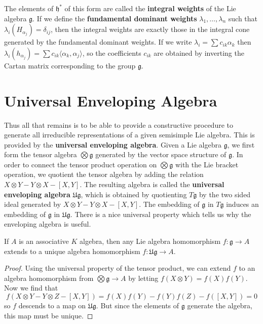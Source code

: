 The elements of $\mathfrak{h}^*$ of this form are called the {\bf integral weights} of the Lie algebra $\mathfrak{g}$. If we define the {\bf fundamental dominant weights} $\lambda_1, \dots, \lambda_n$ such that $\lambda_i(H_{\alpha_j}) = \delta_{ij}$, then the integral weights are exactly those in the integral cone generated by the fundamental dominant weights. If we write $\lambda_i = \sum c_{ik} \alpha_k$ then $\lambda_i(h_{\alpha_j}) = \sum c_{ik} \langle \alpha_k, \alpha_j \rangle$, so the coefficients $c_{ik}$ are obtained by inverting the Cartan matrix corresponding to the group $\mathfrak{g}$.

\section{Universal Enveloping Algebra}

Thus all that remains is to be able to provide a constructive procedure to generate all irreducible representations of a given semisimple Lie algebra. This is provided by the {\bf universal enveloping algebra}. Given a Lie algebra $\mathfrak{g}$, we first form the tensor algebra $\bigotimes \mathfrak{g}$ generated by the vector space structure of $\mathfrak{g}$. In order to connect the tensor product operation on $\bigotimes\mathfrak{g}$ with the Lie bracket operation, we quotient the tensor algebra by adding the relation $X \otimes Y - Y \otimes X - [X,Y]$. The resulting algebra is called the {\bf universal enveloping algebra} $\mathfrak{U g}$, which is obtained by quotienting $T\mathfrak{g}$ by the two sided ideal generated by $X \otimes Y - Y \otimes X - [X,Y]$. The embedding of $\mathfrak{g}$ in $T\mathfrak{g}$ induces an embedding of $\mathfrak{g}$ in $\mathfrak{U g}$. There is a nice universal property which tells us why the enveloping algebra is useful.

\begin{theorem}
    If $A$ is an associative $K$ algebra, then any Lie algebra homomorphism $f: \mathfrak{g} \to A$ extends to a unique algebra homomorphism $f: \mathfrak{Ug} \to A$.
\end{theorem}
\begin{proof}
    Using the universal property of the tensor product, we can extend $f$ to an algebra homomorphism from $\bigotimes \mathfrak{g} \to A$ by letting $f(X \otimes Y) = f(X)f(Y)$. Now we find that
    \[ f(X \otimes Y - Y \otimes Z - [X,Y]) = f(X)f(Y) - f(Y)f(Z) - f([X,Y]) = 0 \]
    so $f$ descends to a map on $\mathfrak{Ug}$. But since the elements of $\mathfrak{g}$ generate the algebra, this map must be unique.
\end{proof}

